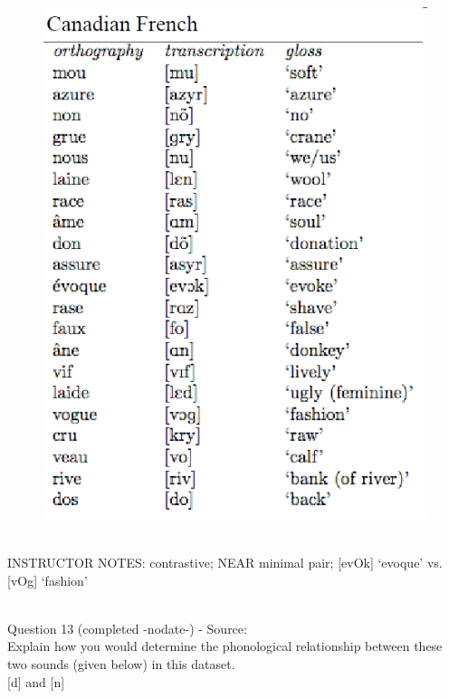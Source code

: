 \documentclass[12pt]{article}
\begin{document}
\begin{figure}[H]
\includegraphics{../images/canadianfrench.png}
\end{figure}

~\\
INSTRUCTOR NOTES: contrastive; NEAR minimal pair; [evOk] ‘evoque’ vs. [vOg] ‘fashion’


~\\

{\large Question 13} (completed -nodate-) - Source: \\

Explain how you would determine the phonological relationship between these two sounds (given below) in this dataset.\\

{[d]} and {[n]}
\end{document}
